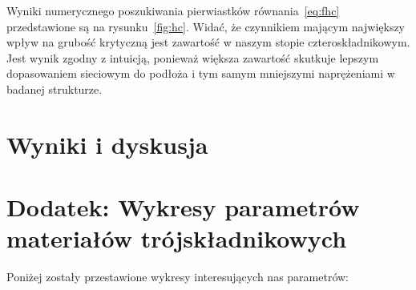 \documentclass[12pt,openany,a4paper]{book}
\begin{document}
Wyniki numerycznego poszukiwania pierwiastków równania~\ref{eq:fhc} przedstawione są 
na rysunku~\ref{fig:hc}. Widać, że czynnikiem mającym największy wpływ na grubość krytyczną jest
zawartość  w naszym stopie czteroskładnikowym. Jest wynik zgodny z intuicją, ponieważ
większa zawartość  skutkuje lepszym dopasowaniem sieciowym do podłoża i tym samym
mniejszymi naprężeniami w badanej strukturze. 

\chapter{Wyniki i dyskusja}\label{chapt:results}


\chapter*{Dodatek: Wykresy parametrów materiałów trójskładnikowych}\label{chapt:dodatek}
Poniżej zostały przestawione wykresy interesujących nas parametrów:
\end{document}
